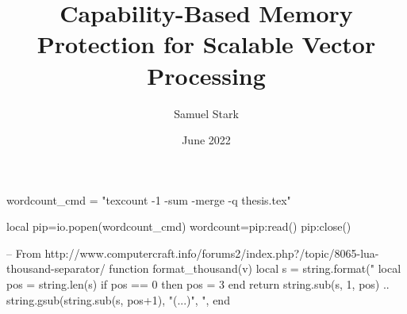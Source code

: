 
\title{Capability-Based Memory Protection for Scalable Vector Processing}

\author{Samuel Stark}





\date{June 2022}

\begin{luacode*}
wordcount_cmd = "texcount -1 -sum -merge -q thesis.tex"

local pip=io.popen(wordcount_cmd)
wordcount=pip:read()
pip:close()
    
-- From http://www.computercraft.info/forums2/index.php?/topic/8065-lua-thousand-separator/
function format_thousand(v)
    local s = string.format("%
    local pos = string.len(s) %
    if pos == 0 then pos = 3 end
    return string.sub(s, 1, pos)
    .. string.gsub(string.sub(s, pos+1), "(...)", ",%
end
\end{luacode*}

